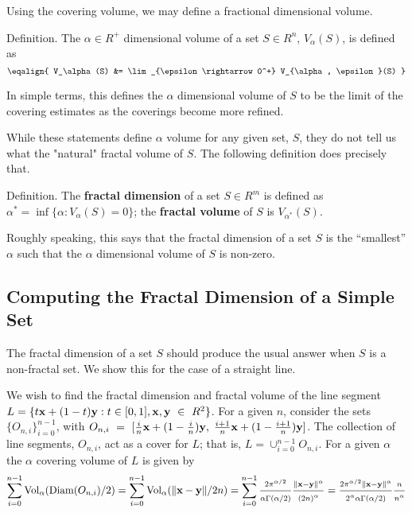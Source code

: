 Using the covering volume, we may define a fractional dimensional volume.

\proclaim Definition. The $\alpha \in R^+$ dimensional volume of a set
$S \in R^n$, $V_\alpha(S)$,
is defined as
$$
\eqalign{
V_\alpha(S) &= \lim_{\epsilon \rightarrow 0^+} V_{\alpha, \epsilon}(S)
}
$$

 In simple terms, this defines the $\alpha$ dimensional volume of $S$
to be the limit of the covering estimates as the coverings become more refined.

While these statements define $\alpha$ volume for any given set, $S$,
they do not tell us what the "natural" fractal volume of $S$.
 The following definition does precisely that.

\proclaim Definition. The {\bf fractal dimension} of a 
set $S \in R^m$ is defined as
$\alpha^* = \inf\{\alpha : V_\alpha(S) = 0 \}$; the 
{\bf fractal volume} of $S$ is $V_{\alpha^*}(S)$.

Roughly speaking, this says that the fractal dimension of a set $S$ is the
``smallest'' $\alpha$ such that the $\alpha$ dimensional volume of $S$ is non-zero.

\subsection{Computing the Fractal Dimension of a Simple Set}

The fractal dimension of a set $S$ should produce the usual
answer when $S$ is a non-fractal set. We show this for the case of a
straight line.

We wish to find the fractal dimension and fractal volume of the line
segment $L = \{t{\bf x} + (1-t){\bf y} : t \in [0,1] , {\bf x, y}~\in~R^2\}$.
For a given $n$, consider the sets $\{O_{n,i}\}_{i=0}^{n-1}$, with $O_{n,i}~=~
[\frac{i}{n}{\bf x} + (1-\frac{i}{n}){\bf y}, \; \frac{i+1}{n}{\bf x} + (1 -
\frac{i+1}{n}){\bf y}]$. The collection of line segments, $O_{n,i}$, act
as a cover for $L$; that is, $L =
\cup_{i=0}^{n-1} O_{n,i}$. For a given $\alpha$ the
$\alpha$ covering volume of $L$ is given by
$$
\sum_{i=0}^{n-1} {\rm Vol}_\alpha({\rm Diam}(O_{n,i})/2) = \sum_{i=0}^{n-1}
{\rm Vol}_\alpha(\|{\bf x} - {\bf y}\|/2n) =  \sum_{i=0}^{n-1} \frac{2
\pi^{\alpha / 2}}{\alpha \Gamma(\alpha / 2)} \frac{\|{\bf x} - {\bf
y}\|^\alpha}{(2n)^\alpha} = \frac{2 \pi^{\alpha / 2} \|{\bf x} - {\bf
y}\|^\alpha}{2^\alpha \alpha \Gamma(\alpha / 2)} \frac{n}{n^\alpha}
$$

